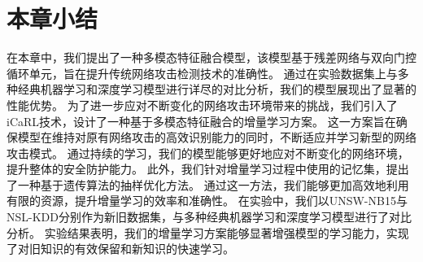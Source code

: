 \section{本章小结}
在本章中，我们提出了一种多模态特征融合模型，该模型基于残差网络与双向门控循环单元，旨在提升传统网络攻击检测技术的准确性。
通过在实验数据集上与多种经典机器学习和深度学习模型进行详尽的对比分析，我们的模型展现出了显著的性能优势。
为了进一步应对不断变化的网络攻击环境带来的挑战，我们引入了iCaRL技术，设计了一种基于多模态特征融合的增量学习方案。
这一方案旨在确保模型在维持对原有网络攻击的高效识别能力的同时，不断适应并学习新型的网络攻击模式。
通过持续的学习，我们的模型能够更好地应对不断变化的网络环境，提升整体的安全防护能力。
此外，我们针对增量学习过程中使用的记忆集，提出了一种基于遗传算法的抽样优化方法。
通过这一方法，我们能够更加高效地利用有限的资源，提升增量学习的效率和准确性。
在实验中，我们以UNSW-NB15与NSL-KDD分别作为新旧数据集，与多种经典机器学习和深度学习模型进行了对比分析。
实验结果表明，我们的增量学习方案能够显著增强模型的学习能力，实现了对旧知识的有效保留和新知识的快速学习。